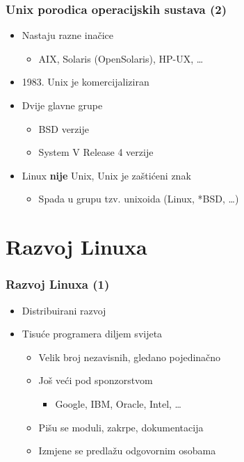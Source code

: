 \documentclass{beamer}
\begin{document}
\begin{frame}[t]
\frametitle{Unix porodica operacijskih sustava (2)}
\begin{itemize}
  \item Nastaju razne inačice
  \begin{itemize}
    \item AIX, Solaris (OpenSolaris), HP-UX, \ldots
  \end{itemize}
  \item 1983. Unix je komercijaliziran
  \item Dvije glavne grupe
  \begin{itemize}
    \item BSD verzije
    \item System V Release 4 verzije
  \end{itemize}
  \item Linux \textbf{nije} Unix, Unix je zaštićeni znak
  \begin{itemize}
    \item Spada u grupu tzv. unixoida (Linux, *BSD, \ldots)
  \end{itemize}
\end{itemize}
\end{frame}

\section{Razvoj Linuxa}
\begin{frame}[t]
\frametitle{Razvoj Linuxa (1)}
\begin{itemize}
  \item Distribuirani razvoj 
  \item Tisuće programera diljem svijeta
  \begin{itemize}
    \item Velik broj nezavisnih, gledano pojedinačno
    \item Još veći pod sponzorstvom
    \begin{itemize}
      \item Google, IBM, Oracle, Intel, \ldots
    \end{itemize}
  \item Pišu se moduli, zakrpe, dokumentacija
  \item Izmjene se predlažu odgovornim osobama
  \end{itemize}
\end{itemize}
\end{frame}
\end{document}
